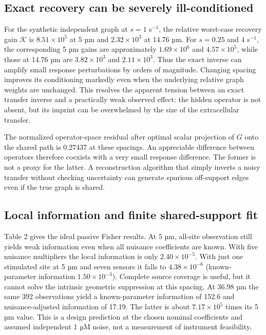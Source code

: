 \documentclass[
  11pt,
]{article}
\begin{document}
\subsection{Exact recovery can be severely
ill-conditioned}\label{exact-recovery-can-be-severely-ill-conditioned}

For the synthetic independent graph at \(s=1\) s\(^{-1}\), the relative
worst-case recovery gain \(\mathcal K\) is \(8.51\times10^5\) at 5 µm
and \(2.32\times10^3\) at 14.76 µm. For \(s=0.25\) and \(4\) s\(^{-1}\),
the corresponding 5 µm gains are approximately \(1.69\times10^6\) and
\(4.57\times10^5\), while those at 14.76 µm are \(3.82\times10^3\) and
\(2.11\times10^3\). Thus the exact inverse can amplify small response
perturbations by orders of magnitude. Changing spacing improves its
conditioning markedly even when the underlying relative graph weights
are unchanged. This resolves the apparent tension between an exact
transfer inverse and a practically weak observed effect: the hidden
operator is not absent, but its imprint can be overwhelmed by the size
of the extracellular transfer.

The normalized operator-space residual after optimal scalar projection
of \(G\) onto the shared path is 0.27437 at these spacings. An
appreciable difference between operators therefore coexists with a very
small response difference. The former is not a proxy for the latter. A
reconstruction algorithm that simply inverts a noisy transfer without
checking uncertainty can generate spurious off-support edges even if the
true graph is shared.

\subsection{Local information and finite shared-support
fit}\label{local-information-and-finite-shared-support-fit}

Table 2 gives the ideal passive Fisher results. At 5 µm, all-site
observation still yields weak information even when all nuisance
coefficients are known. With five nuisance multipliers the local
information is only \(2.40\times10^{-5}\). With just one stimulated site
at 5 µm and seven sensors it falls to \(4.38\times10^{-6}\)
(known-parameter information \(1.50\times10^{-3}\)). Complete source
coverage is useful, but it cannot solve the intrinsic geometric
suppression at this spacing. At 36.98 µm the same 392 observations yield
a known-parameter information of 152.6 and nuisance-adjusted information
of 17.19. The latter is about \(7.17\times10^5\) times its 5 µm value.
This is a design prediction at the chosen nominal coefficients and
assumed independent 1 µM noise, not a measurement of instrument
feasibility.
\end{document}
